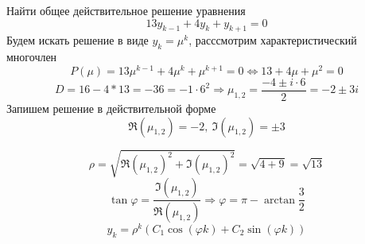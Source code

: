 \begin{task}
  Найти общее действительное решение уравнения
  \[13y_{k-1}+4y_k+y_{k+1}=0\]
  Будем искать решение в виде $y_k=\mu^k$, расссмотрим характеристический
  многочлен
  \[P(\mu)=13\mu^{k-1}+4\mu^k+\mu^{k+1}=0\Leftrightarrow13+4\mu+\mu^2=0\]
  \[D=16-4*13=-36=-1\cdot6^2\Rightarrow\mu_{1,2}=\frac{-4\pm i\cdot6}{2}=-2\pm 3i\]
  Запишем решение в действительной форме
  \[\Re(\mu_{1,2})=-2,\ \Im(\mu_{1,2})=\pm3\]

  \begin{minipage}{.3\linewidth}
  \end{minipage}\hfill
  \begin{minipage}{.7\linewidth}
    \[\rho=\sqrt{\Re(\mu_{1,2})^2 + \Im(\mu_{1,2})^2}=\sqrt{4 + 9}=\sqrt{13}\]
    \[\tan{\varphi}=\frac{\Im(\mu_{1,2})}{\Re(\mu_{1,2})}\Rightarrow\varphi=\pi-\arctan{\frac{3}{2}}\]
    \[y_k=\rho^k(C_1\cos(\varphi k)+C_2\sin(\varphi k))\]
  \end{minipage}
\end{task}
